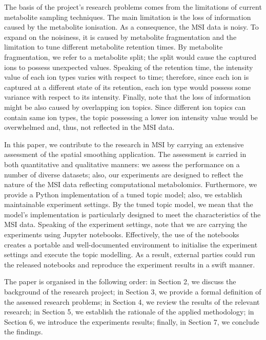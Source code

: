 \documentclass{mpaper}
\begin{document}
\par The basis of the project's research problems comes from the limitations of current metabolite sampling techniques. The main limitation is the loss of information caused by the metabolite ionisation. As a consequence, the MSI data is noisy. To expand on the noisiness, it is caused by metabolite fragmentation and the limitation to tune different metabolite retention times. By metabolite fragmentation, we refer to a metabolite split; the split would cause the captured ions to possess unexpected values. Speaking of the retention time, the intensity value of each ion types varies with respect to time; therefore, since each ion is captured at a different state of its retention, each ion type would possess some variance with respect to its intensity. Finally, note that the loss of information might be also caused by overlapping ion topics. Since different ion topics can contain same ion types, the topic possessing a lower ion intensity value would be overwhelmed and, thus, not reflected in the MSI data.
\par In this paper, we contribute to the research in MSI by carrying an extensive assessment of the spatial smoothing application. The assessment is carried in both quantitative and qualitative manners: we assess the performance on a number of diverse datasets; also, our experiments are designed to reflect the nature of the MSI data reflecting computational metabolomics. Furthermore, we provide a Python implementation of a tuned topic model; also, we establish maintainable experiment settings. By the tuned topic model, we mean that the model's implementation is particularly designed to meet the characteristics of the MSI data. Speaking of the experiment settings, note that we are carrying the experiments using Jupyter notebooks. Effectively, the use of the notebooks creates a portable and well-documented environment to initialise the experiment settings and execute the topic modelling. As a result, external parties could run the released notebooks and reproduce the experiment results in a swift manner.

\par The paper is organised in the following order: in Section 2, we discuss the background of the research project; in Section 3, we provide a formal definition of the assessed research problems; in Section 4, we review the results of the relevant research; in Section 5, we establish the rationale of the applied methodology; in Section 6, we introduce the experiments results; finally, in Section 7, we conclude the findings. 
\end{document}
